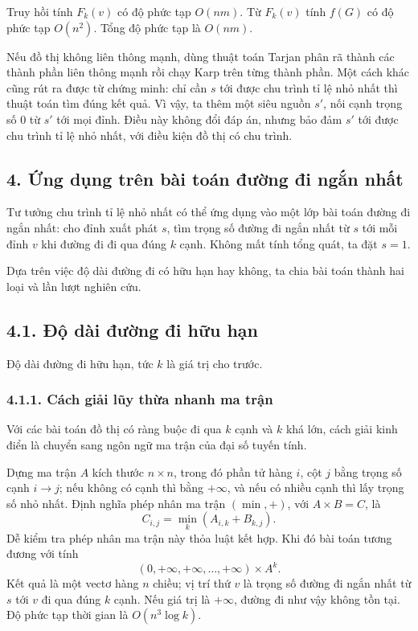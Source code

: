 \documentclass[11pt]{article}
\begin{document}
Truy hồi tính \(F_k(v)\) có độ phức tạp \(O(nm)\). Từ \(F_k(v)\) tính \(f(G)\)
có độ phức tạp \(O(n^2)\). Tổng độ phức tạp là \(O(nm)\).

Nếu đồ thị không liên thông mạnh, dùng thuật toán Tarjan phân rã thành các
thành phần liên thông mạnh rồi chạy Karp trên từng thành phần. Một cách khác
cũng rút ra được từ chứng minh: chỉ cần \(s\) tới được chu trình tỉ lệ nhỏ nhất
thì thuật toán tìm đúng kết quả. Vì vậy, ta thêm một siêu nguồn \(s'\), nối
cạnh trọng số \(0\) từ \(s'\) tới mọi đỉnh. Điều này không đổi đáp án, nhưng
bảo đảm \(s'\) tới được chu trình tỉ lệ nhỏ nhất, với điều kiện đồ thị có chu
trình.

\subsection*{4. Ứng dụng trên bài toán đường đi ngắn nhất}

Tư tưởng chu trình tỉ lệ nhỏ nhất có thể ứng dụng vào một lớp bài toán đường đi
ngắn nhất: cho đỉnh xuất phát \(s\), tìm trọng số đường đi ngắn nhất từ \(s\)
tới mỗi đỉnh \(v\) khi đường đi đi qua đúng \(k\) cạnh. Không mất tính tổng
quát, ta đặt \(s=1\).

Dựa trên việc độ dài đường đi có hữu hạn hay không, ta chia bài toán thành hai
loại và lần lượt nghiên cứu.

\subsection*{4.1. Độ dài đường đi hữu hạn}

Độ dài đường đi hữu hạn, tức \(k\) là giá trị cho trước.

\subsubsection*{4.1.1. Cách giải lũy thừa nhanh ma trận}

Với các bài toán đồ thị có ràng buộc đi qua \(k\) cạnh và \(k\) khá lớn, cách
giải kinh điển là chuyển sang ngôn ngữ ma trận của đại số tuyến tính.

Dựng ma trận \(A\) kích thước \(n\times n\), trong đó phần tử hàng \(i\), cột
\(j\) bằng trọng số cạnh \(i\to j\); nếu không có cạnh thì bằng \(+\infty\), và
nếu có nhiều cạnh thì lấy trọng số nhỏ nhất. Định nghĩa phép nhân ma trận
\((\min,+)\), với \(A\times B=C\), là
\[
  C_{i,j}=\min_k(A_{i,k}+B_{k,j}).
\]
Dễ kiểm tra phép nhân ma trận này thỏa luật kết hợp. Khi đó bài toán tương
đương với tính
\[
  (0,+\infty,+\infty,\ldots,+\infty)\times A^k.
\]
Kết quả là một vectơ hàng \(n\) chiều; vị trí thứ \(v\) là trọng số đường đi
ngắn nhất từ \(s\) tới \(v\) đi qua đúng \(k\) cạnh. Nếu giá trị là
\(+\infty\), đường đi như vậy không tồn tại. Độ phức tạp thời gian là
\(O(n^3\log k)\).
\end{document}
